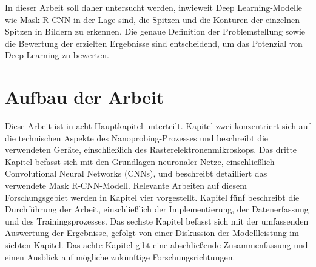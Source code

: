 In dieser Arbeit soll daher untersucht werden, inwieweit Deep Learning-Modelle wie Mask R-CNN in der Lage sind, die Spitzen und die Konturen der einzelnen Spitzen in Bildern zu erkennen. Die genaue Definition der Problemstellung sowie die Bewertung der erzielten Ergebnisse sind entscheidend, um das Potenzial von Deep Learning zu bewerten.
\section{Aufbau der Arbeit}
Diese Arbeit ist in acht Hauptkapitel unterteilt. Kapitel zwei konzentriert sich auf die technischen Aspekte des Nanoprobing-Prozesses und beschreibt die verwendeten Geräte, einschließlich des Rasterelektronenmikroskops. Das dritte Kapitel befasst sich mit den Grundlagen neuronaler Netze, einschließlich Convolutional Neural Networks (CNNs), und beschreibt detailliert das verwendete Mask R-CNN-Modell. Relevante Arbeiten auf diesem Forschungsgebiet werden in Kapitel vier vorgestellt.
 Kapitel fünf beschreibt die Durchführung der Arbeit, einschließlich der Implementierung, der Datenerfassung und des Trainingsprozesses. Das sechste Kapitel befasst sich mit der umfassenden Auswertung der Ergebnisse, gefolgt von einer Diskussion der Modellleistung im siebten Kapitel. Das achte Kapitel gibt eine abschließende Zusammenfassung und einen Ausblick auf mögliche zukünftige Forschungsrichtungen.